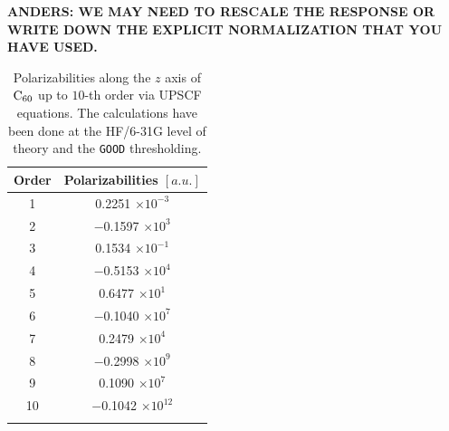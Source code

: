\documentclass[prl,aps,twocolumn,showpacs,twocolumngrid,superbib]{revtex4}
\begin{document}
{\bf ANDERS: WE MAY NEED TO RESCALE THE RESPONSE OR 
 WRITE DOWN THE EXPLICIT NORMALIZATION THAT YOU HAVE USED.}
\begin{table}[t]
  \centering
  \caption{\protect 
    Polarizabilities along the $z$ axis of $\rm C_{60}$ up 
    to $10$-th order via UPSCF equations.
    The calculations have been done at the HF/6-31G level of 
    theory and the {\tt GOOD} thresholding.
  }\label{tab:C60_Values}
  \begin{tabular}{cc}
    \toprule
    Order & Polarizabilities $[a.u.]$\\
    \hline
     1 &    0.2251 $\times 10^{-3}$\\
     2 & $-$0.1597 $\times 10^{3}$\\
     3 &    0.1534 $\times 10^{-1}$\\
     4 & $-$0.5153 $\times 10^{4}$\\
     5 &    0.6477 $\times 10^{1}$\\
     6 & $-$0.1040 $\times 10^{7}$\\
     7 &    0.2479 $\times 10^{4}$\\
     8 & $-$0.2998 $\times 10^{9}$\\
     9 &    0.1090 $\times 10^{7}$\\
    10 & $-$0.1042 $\times 10^{12}$\\
    \botrule
  \end{tabular}
\end{table}
\end{document}
